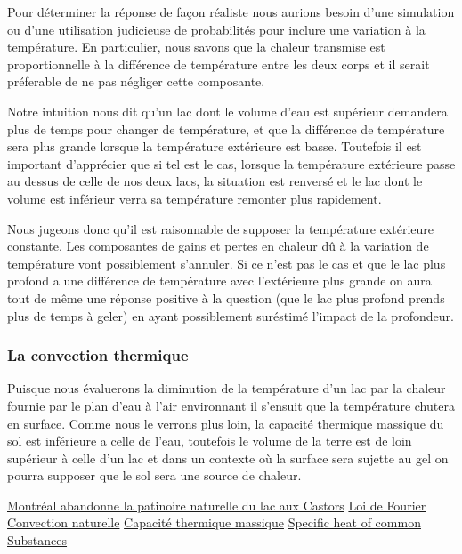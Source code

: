 \documentclass[12pt]{article}
\begin{document}
Pour d\'eterminer la r\'eponse de fa\c con r\'ealiste nous aurions besoin d'une simulation ou d'une
utilisation judicieuse de probabilit\'es pour inclure une variation \`a la temp\'erature. En particulier,
nous savons que la chaleur transmise est proportionnelle \`a la diff\'erence de temp\'erature entre les
deux corps\cite{Fourier} et il serait pr\'eferable de ne pas n\'egliger cette composante.

Notre intuition nous dit qu'un lac dont le volume d'eau est sup\'erieur demandera plus de temps pour
changer de temp\'erature, et que la diff\'erence de temp\'erature sera plus grande lorsque la
temp\'erature ext\'erieure est basse. Toutefois il est important d'appr\'ecier que si tel est le cas,
lorsque la temp\'erature ext\'erieure passe au dessus de celle de nos deux lacs, la situation est
renvers\'e et le lac dont le volume est inf\'erieur verra sa temp\'erature remonter plus rapidement.

Nous jugeons donc qu'il est raisonnable de supposer la temp\'erature ext\'erieure constante. Les
composantes de gains et pertes en chaleur d\^u \`a la variation de temp\'erature vont possiblement
s'annuler. Si ce n'est pas le cas et que le lac plus profond a une diff\'erence de temp\'erature avec
l'ext\'erieure plus grande on aura tout de m\^eme une r\'eponse positive \`a la question (que le lac plus
profond prends plus de temps \`a geler) en ayant possiblement sur\'estim\'e l'impact de la profondeur.

\subsubsection{La convection thermique}

Puisque nous \'evaluerons la diminution de la temp\'erature d'un lac par la chaleur fournie par le plan
d'eau \`a l'air environnant il s'ensuit que la temp\'erature chutera en surface. Comme nous le verrons
plus loin, la capacit\'e thermique\cite{CapTherm} massique du sol est inf\'erieure a celle de l'eau,
toutefois le volume de la terre est de loin sup\'erieur \`a celle d'un lac et dans un contexte o\`u la
surface sera sujette au gel on pourra supposer que le sol sera une source de chaleur.

\clearpage
\begin{thebibliography}{Xyz}
        \href{https://www.ledevoir.com/politique/montreal/517828/patinoire-du-lac-aux-castors}
            {Montr\'eal abandonne la patinoire naturelle du lac aux Castors}
     \href{https://fr.wikipedia.org/wiki/Conduction_thermique#Loi_de_Fourier}
        {Loi de Fourier}
     \href{https://fr.wikipedia.org/wiki/Convection_thermique#Convection_naturelle}
        {Convection naturelle}
     \href{https://fr.wikipedia.org/wiki/Capacit%C3%A9_thermique_massique}
        {Capacit\'e thermique massique}
     \href{https://www.engineeringtoolbox.com/specific-heat-capacity-d_391.html}
        {Specific heat of common Substances}
\end{thebibliography}
\end{document}
